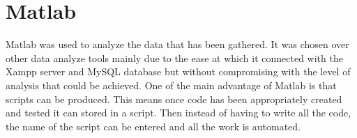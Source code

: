 \section{Matlab} %
\label{sec:section_matlab}
Matlab was used to analyze the data that has been gathered. It was chosen over other data analyze tools mainly due to the ease at which it connected with the Xampp server and MySQL database but without compromising with the level of analysis that could be achieved. One of the main advantage of Matlab is that scripts can be produced. This means once code has been appropriately created and tested it can stored in a script. Then instead of having to write all the code, the name of the script can be entered and all the work is automated. 
 